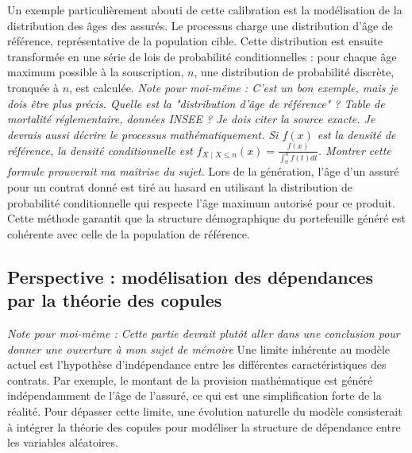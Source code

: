 Un exemple particulièrement abouti de cette calibration est la modélisation de la distribution des âges des assurés. Le processus charge une distribution d'âge de référence, représentative de la population cible. Cette distribution est ensuite transformée en une série de lois de probabilité conditionnelles : pour chaque âge maximum possible à la souscription, $n$, une distribution de probabilité discrète, tronquée à $n$, est calculée. \textit{Note pour moi-même : C'est un bon exemple, mais je dois être plus précis. Quelle est la "distribution d'âge de référence" ? Table de mortalité réglementaire, données INSEE ? Je dois citer la source exacte. Je devrais aussi décrire le processus mathématiquement. Si $f(x)$ est la densité de référence, la densité conditionnelle est $f_{X \mid X \leq n}(x) = \frac{f(x)}{\int_0^n f(t)dt}$. Montrer cette formule prouverait ma maîtrise du sujet.}
Lors de la génération, l'âge d'un assuré pour un contrat donné est tiré au hasard en utilisant la distribution de probabilité conditionnelle qui respecte l'âge maximum autorisé pour ce produit. Cette méthode garantit que la structure démographique du portefeuille généré est cohérente avec celle de la population de référence.

\subsection{Perspective : modélisation des dépendances par la théorie des copules}

\textit{Note pour moi-même : Cette partie devrait plutôt aller dans une conclusion pour donner une ouverture à mon sujet de mémoire}
Une limite inhérente au modèle actuel est l'hypothèse d'indépendance entre les différentes caractéristiques des contrats. Par exemple, le montant de la provision mathématique est généré indépendamment de l'âge de l'assuré, ce qui est une simplification forte de la réalité. Pour dépasser cette limite, une évolution naturelle du modèle consisterait à intégrer la théorie des copules pour modéliser la structure de dépendance entre les variables aléatoires.

